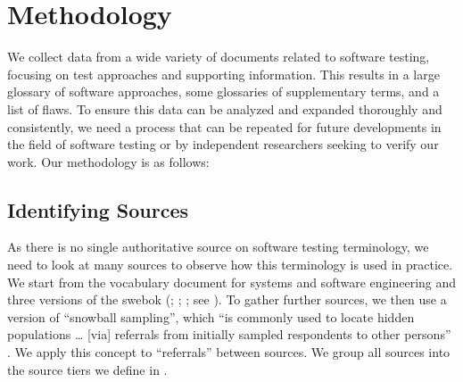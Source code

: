\section{Methodology}\label{methodology}

We collect data %
from a wide variety of documents related to software testing, focusing on
test approaches and supporting information. This results in a large
glossary of software approaches, some glossaries of supplementary terms, and a
list of flaws. To ensure this data can be analyzed and expanded thoroughly and
consistently, we need a process that can be repeated for future developments in
the field of software testing or by independent researchers seeking to verify
our work. Our methodology is as follows:



\subsection{Identifying Sources}\label{ident-sources}
As there is no single authoritative source on software testing terminology,
we need to look at many sources to observe how this terminology is used in
practice. %
We start from the vocabulary document for systems and software engineering%
 \citep{IEEE2017} and three versions of the
\acf{swebok} (\citealp{SWEBOK2014}; \citealp{SWEBOK2024};
\citeyear{SWEBOK2025}; see ).
To gather further sources, we then use a version of ``snowball sampling'',
which ``is commonly used to locate hidden populations \dots{} [via] referrals
from initially sampled respondents to other persons'' \citep{Johnson2014}. We
apply this concept to ``referrals'' between sources. \addTextEx{} We group all
sources into the source tiers we define in \listAllSrcs{}.

